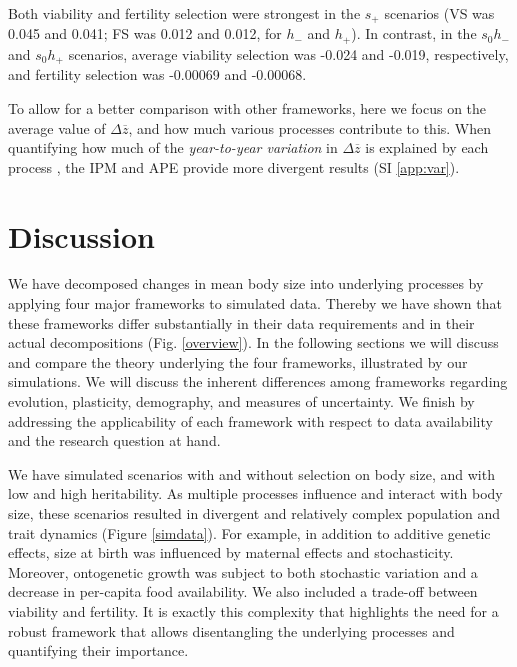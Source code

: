 Both viability and fertility selection were strongest in the $s_+$ scenarios (VS was 0.045 and 0.041; FS was 0.012 and 0.012, for $h_{-}$ and $h_+$). In contrast, in the $s_0 h_-$ and $s_0 h_+$ scenarios, average viability selection was -0.024 and -0.019, respectively, and fertility selection was -0.00069 and -0.00068.

To allow for a better comparison with other frameworks, here we focus on the average value of $\Delta \overline z$, and how much various processes contribute to this. When quantifying how much of the \emph{year-to-year variation} in $\Delta \overline z$ is explained by each process \parencite[as for example in][]{Ozgul2009}, the IPM and APE provide more divergent results (SI \ref{app:var}).

\section{Discussion}
We have decomposed changes in mean body size into underlying processes by applying four major  frameworks to simulated data. Thereby we have shown that these frameworks differ substantially in their data requirements and in their actual decompositions (Fig. \ref{overview}). In the following sections we will discuss and compare the theory underlying the four frameworks, illustrated by our simulations. We will discuss the inherent differences among frameworks regarding evolution, plasticity, demography, and measures of uncertainty. We finish by addressing the applicability of each framework with respect to data availability and the research question at hand.

We have simulated scenarios with and without selection on body size, and with low and high heritability. As multiple processes influence and interact with body size, these scenarios resulted in divergent and relatively complex population and trait dynamics (Figure \ref{simdata}). For example, in addition to additive genetic effects, size at birth was influenced by maternal effects and stochasticity. Moreover, ontogenetic growth was subject to both stochastic variation and a decrease in per-capita food availability. We also included a trade-off between viability and fertility. It is exactly this complexity that highlights the need for a robust framework that allows disentangling the underlying processes and quantifying their importance.

